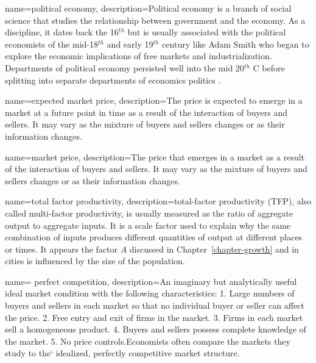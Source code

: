 {
name=political economy,
description={Political economy is a branch of social science that studies the relationship  between government and the economy. As a discipline, it dates back the  16$^{th}$ but is usually associated with the political economists of the mid-18$^{th}$ and  early 19$^{th}$  century like Adam Smith who began to explore the economic implications of free markets and industrialization. Departments of political economy persisted well into the mid 20$^{th}$ C before splitting into separate departments of economics politics \cite{helleiner20PoliticalEconomy2018}.}
}

{
name=expected market price,
description={The price is expected to emerge in a \gls{market} at a future point in time as a result of the interaction of buyers and sellers. It may vary as the mixture of buyers and sellers changes or as their information changes.}
}

{
name=market price,
description={The price that emerges in a \gls{market} as a result of the interaction of buyers and sellers. It may vary as the mixture of buyers and sellers changes or as their information changes.}
}




{
name=total factor productivity,
description={total-factor productivity (TFP), also called multi-factor productivity, is usually measured as the ratio of aggregate output  to aggregate inputs. It is a scale factor used to explain why the same combination of inputs produces different quantities of output at different places or times. It appears the factor  $A$ discussed in Chapter~\ref{chapter-growth} and in cities is influenced by the size of the population.  }
}

{
name= perfect competition,
description={An imaginary but analytically useful ideal market condition with the following  characteristics: 1. Large numbers of buyers and sellers in each market so that no individual buyer or seller can affect the price. 2. Free entry and exit of firms in the market. 3. Firms in each market sell a homogeneous product. 4. Buyers and sellers possess complete knowledge of the market. 5. No price controls.\newline  Economists often compare the markets they study to the` idealized, perfectly competitive market structure.}
}

